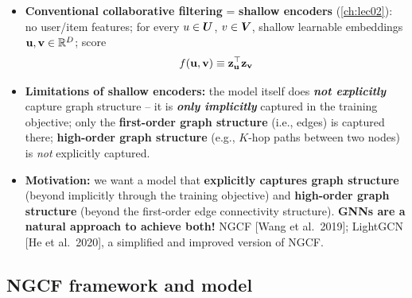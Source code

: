 \begin{itemize}
  \item \textbf{Conventional collaborative filtering} = \textbf{shallow
    encoders} (\cref{ch:lec02}): no user/item features; for every $u\in\bm{U}$,
    $v\in\bm{V}$, shallow learnable embeddings $\mathbf{u},\mathbf{v}\in\mathbb{R}^D$; score
    \begin{equation}\label{eq:lec11-mf}
      f(\mathbf{u},\mathbf{v})\equiv\mathbf{z}_{\mathbf{u}}^{\top}\mathbf{z}_{\mathbf{v}}
    \end{equation}
  \item \textbf{Limitations of shallow encoders:} the model itself does
    \textbf{\emph{not explicitly}} capture graph structure -- it is
    \textbf{\emph{only implicitly}} captured in the training objective; only the
    \textbf{first-order graph structure} (i.e., edges) is captured there;
    \textbf{high-order graph structure} (e.g., $K$-hop paths between two nodes)
    is \emph{not} explicitly captured.
  \item \textbf{Motivation:} we want a model that \textbf{explicitly captures
    graph structure} (beyond implicitly through the training objective) and
    \textbf{high-order graph structure} (beyond the first-order edge
    connectivity structure). \textbf{GNNs are a natural approach to achieve
    both!} NGCF [Wang et al.\ 2019]; LightGCN [He et al.\ 2020], a simplified
    and improved version of NGCF.
\end{itemize}

\subsection{NGCF framework and model}\label{sec:lec11-ngcf-model}

